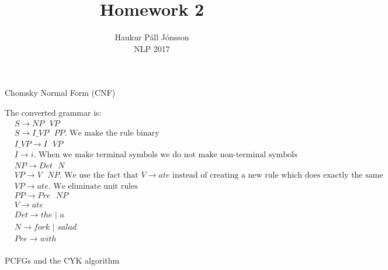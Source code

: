\documentclass[12pt]{article}
\newenvironment{question}[2][Question]{\begin{trivlist}
\item[\hskip \labelsep {\bfseries #1}\hskip \labelsep {\bfseries #2.}]}{\end{trivlist}}
\newenvironment{answer}[2][Answer]{\begin{trivlist}
\item[\hskip \labelsep {\bfseries #1}\hskip \labelsep {\bfseries #2:}]}{\end{trivlist}}
\begin{document}
\renewcommand{\theenumi}{\roman{enumi}}

\let\oldsum\sum
\renewcommand{\sum}[3]{\oldsum\limits_{#1}^{#2}#3}
\let\oldprod\prod
\renewcommand{\prod}[3]{\oldprod\limits_{#1}^{#2}#3}


\title{Homework 2}
\author{Haukur Páll Jónsson\\
NLP 2017}

\maketitle

\begin{question}{1}
Chomsky Normal Form (CNF)
\end{question}
\begin{answer}{a)}{}

The converted grammar is:
\begin{align*}
&S \to NP \text{  } VP \\
&S \to I\_VP \text{  } PP. \text{ We make the rule binary}\\
&I\_VP \to I \text{  } VP \\
&I \to i. \text{ When we make terminal symbols we do not make non-terminal symbols}\\
&NP \to Det \text{  } N\\
&VP \to V \text{  } NP. \text{ We use the fact that }V \to ate \text{ instead of creating a new rule which does exactly the same}\\
&VP \to ate. \text{ We eliminate unit rules}\\
&PP \to Pre \text{  } NP\\
&V \to ate\\
&Det \to the \text{ | }a\\
&N \to fork \text{ | }salad\\
&Pre \to with\\
\end{align*}
\end{answer}

\begin{question}{2}
PCFGs and the CYK algorithm
\end{question}
\end{document}
